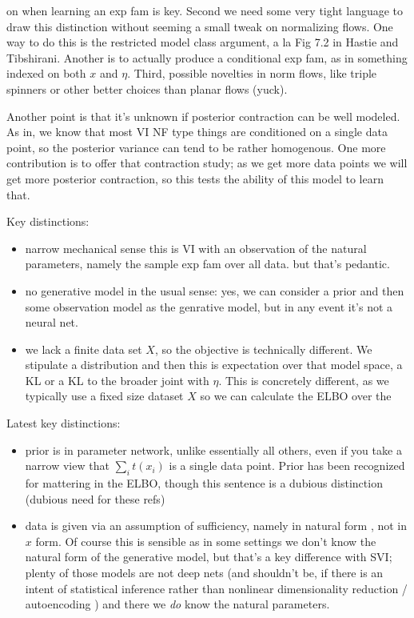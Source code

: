 \documentclass{article}
\begin{document}
on when learning an exp fam is key.  Second we need some very tight language to draw this distinction without seeming a small tweak on normalizing flows.  One way to do this is the restricted model class argument, a la Fig 7.2 in Hastie and Tibshirani.  Another is to actually produce a conditional exp fam, as in something indexed on both $x$ and $\eta$.  Third, possible novelties in norm flows, like triple spinners or other better choices than planar flows (yuck).

  Another point is that it's unknown if posterior contraction can be well modeled.  As in, we know that most VI NF type things are conditioned on a single data point, so the posterior variance can tend to be rather homogenous.  One more contribution is to offer that contraction study; as we get more data points we will get more posterior contraction, so this tests the ability of this model to learn that.
  
  Key distinctions:
  \begin{itemize}
  \item narrow mechanical sense this is VI with an observation of the natural parameters, namely the sample exp fam over all data.  but that's pedantic.
  \item no generative model in the usual sense: yes, we can consider a prior and then some observation model as the genrative model, but in any event it's not a neural net.
  \item we lack a finite data set $X$, so the objective is technically different.  We stipulate a distribution and then this is expectation over that model space, a KL or a KL to the broader joint with $\eta$.  This is concretely different, as we typically use a fixed size dataset $X$ so we can calculate the ELBO over the 
  \end{itemize}
  
Latest key distinctions:
\begin{itemize}
\item prior is in parameter network, unlike essentially all others, even if you take a narrow view that $\sum_i t(x_i)$ is a single data point.  Prior has been recognized for mattering in the ELBO, though this sentence is a dubious distinction \cite{hoffman2016elbo,cremer2018inference} (dubious need for these refs)
\item data is given via an assumption of sufficiency, namely in natural form \cite{robert2007bayesian}, not in $x$ form.  Of course this is sensible as in some settings we don't know the natural form of the generative model, but that's a key difference with SVI; plenty of those models are not deep nets (and shouldn't be, if there is an intent of statistical inference rather than nonlinear dimensionality reduction / autoencoding ) and there we \emph{do} know the natural parameters.
\end{itemize}
\end{document}

